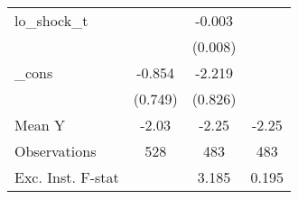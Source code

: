 {\begin{tabular}{l*{3}{c}}
\addlinespace
lo\_shock\_t  &                     &      -0.003         &                     \\
            &                     &     (0.008)         &                     \\
\addlinespace
\_cons      &      -0.854         &      -2.219\sym{**} &                     \\
            &     (0.749)         &     (0.826)         &                     \\
\midrule
Mean Y      &       -2.03         &       -2.25         &       -2.25         \\
Observations&         528         &         483         &         483         \\
Exc. Inst. F-stat&                     &       3.185         &       0.195         \\
\bottomrule
\end{tabular}
}
